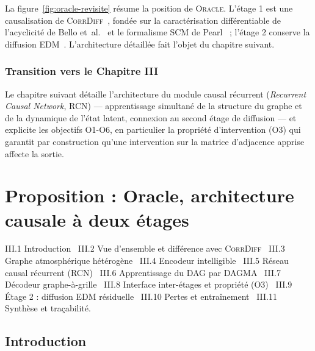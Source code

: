 \documentclass[14pt,a4paper,openany]{extreport}
\theoremstyle{definition}
\newcommand{\Oracle}{\textsc{Oracle}}
\newcommand{\CorrDiff}{\textsc{CorrDiff}}
\begin{document}
La figure~\ref{fig:oracle-revisite} résume la position de \Oracle{}. L'étage 1 est une causalisation de \CorrDiff{}~\cite{mardani_corrdiff_2023}, fondée sur la caractérisation différentiable de l'acyclicité de Bello et~al.~\cite{bello_dagma_2022} et le formalisme SCM de Pearl~\cite{pearl_causality_2009} ; l'étage 2 conserve la diffusion EDM~\cite{karras_edm_2022}. L'architecture détaillée fait l'objet du chapitre suivant.

\subsection{Transition vers le Chapitre III}
\label{ssec:soa-transition}

Le chapitre suivant détaille l'architecture du module causal récurrent (\emph{Recurrent Causal Network}, RCN) --- apprentissage simultané de la structure du graphe et de la dynamique de l'état latent, connexion au second étage de diffusion --- et explicite les objectifs O1-O6, en particulier la propriété d'intervention (O3) qui garantit par construction qu'une intervention sur la matrice d'adjacence apprise affecte la sortie.

\cleardoublepage



\chapter{Proposition : Oracle, architecture causale à deux étages}
\label{chap:oracle}

\begin{sommairebox}
\small
\noindent III.1 Introduction \textbullet\ III.2 Vue d'ensemble et différence avec \CorrDiff{} \textbullet\ III.3 Graphe atmosphérique hétérogène \textbullet\ III.4 Encodeur intelligible \textbullet\ III.5 Réseau causal récurrent (RCN) \textbullet\ III.6 Apprentissage du DAG par DAGMA \textbullet\ III.7 Décodeur graphe-à-grille \textbullet\ III.8 Interface inter-étages et propriété (O3) \textbullet\ III.9 Étage 2 : diffusion EDM résiduelle \textbullet\ III.10 Pertes et entraînement \textbullet\ III.11 Synthèse et traçabilité.
\end{sommairebox}

\vspace{0.5em}

\section{Introduction}
\label{sec:oracle-intro}
\end{document}
